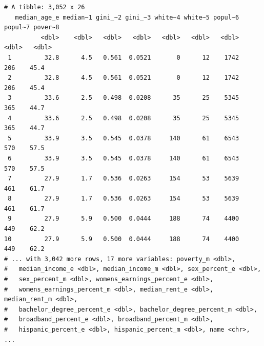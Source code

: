 \documentclass[
  letterpaper,
  DIV=11,
  numbers=noendperiod]{scrreprt}
\begin{document}
\begin{verbatim}
# A tibble: 3,052 x 26
   median_age_e median~1 gini_~2 gini_~3 white~4 white~5 popul~6 popul~7 pover~8
          <dbl>    <dbl>   <dbl>   <dbl>   <dbl>   <dbl>   <dbl>   <dbl>   <dbl>
 1         32.8      4.5   0.561  0.0521       0      12    1742     206    45.4
 2         32.8      4.5   0.561  0.0521       0      12    1742     206    45.4
 3         33.6      2.5   0.498  0.0208      35      25    5345     365    44.7
 4         33.6      2.5   0.498  0.0208      35      25    5345     365    44.7
 5         33.9      3.5   0.545  0.0378     140      61    6543     570    57.5
 6         33.9      3.5   0.545  0.0378     140      61    6543     570    57.5
 7         27.9      1.7   0.536  0.0263     154      53    5639     461    61.7
 8         27.9      1.7   0.536  0.0263     154      53    5639     461    61.7
 9         27.9      5.9   0.500  0.0444     188      74    4400     449    62.2
10         27.9      5.9   0.500  0.0444     188      74    4400     449    62.2
# ... with 3,042 more rows, 17 more variables: poverty_m <dbl>,
#   median_income_e <dbl>, median_income_m <dbl>, sex_percent_e <dbl>,
#   sex_percent_m <dbl>, womens_earnings_percent_e <dbl>,
#   womens_earnings_percent_m <dbl>, median_rent_e <dbl>, median_rent_m <dbl>,
#   bachelor_degree_percent_e <dbl>, bachelor_degree_percent_m <dbl>,
#   broadband_percent_e <dbl>, broadband_percent_m <dbl>,
#   hispanic_percent_e <dbl>, hispanic_percent_m <dbl>, name <chr>, ...
\end{verbatim}
\end{document}
